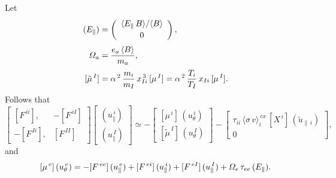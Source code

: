 \documentclass[notitlepage,12pt]{article}
\begin{document}
Let
\begin{align}
(E_\parallel) &=\left(\begin{array}{c}\langle E_\parallel\,B\rangle/\langle B\rangle\\[0.5ex]
0\end{array}\right),\\[0.5ex]
{\mit\Omega}_a &= \frac{e_a\,\langle B\rangle}{m_a},\\[0.5ex]
[\tilde{\mu}^{\,I}] &= \alpha^{\,2}\,\frac{m_i}{m_I}\,x_{Ii}^{\,3}\,[\mu^{\,I}]=\alpha^{\,2}\,\frac{T_i}{T_I}\,x_{Ii}\,[\mu^{\,I}].
\end{align}
Follows that
\begin{equation}
\left[\begin{array}{rr} [F^{\,ii}], & -[F^{\,iI}]\\[0.5ex] -[F^{\,Ii}], & [F^{\,II}]\end{array}\right]
\left[\begin{array}{c}(u_\parallel^{\,i}) \\[0.5ex] (u_\parallel^{\,I})\end{array}\right]
\simeq -\left[\begin{array}{c} [\mu^{\,i}]\,(u_\theta^{\,i}) \\[0.5ex]
[\tilde{\mu}^{\,I}]\,(u_\theta^{\,I})\end{array}\right]-\left[\begin{array}{c}{\tau_{ii}\,\langle\sigma\,v\rangle_i^{\,cx}\,[X^{\,i}]\,(\tilde{u}_{\parallel\,i})}\\[0.5ex] 0\end{array}\right],
\end{equation}
and
\begin{equation}\label{e173}
[\mu^{\,e}]\,(u_\theta^{\,e})= -[F^{\,ee}]\,(u_\parallel^{\,e})+[F^{\,ei}]\,(u_\parallel^{\,i})+[F^{\,eI}]\,(u_\parallel^{\,I})+{\mit\Omega}_e\,\tau_{ee}\,(E_\parallel).
\end{equation}
\end{document}
